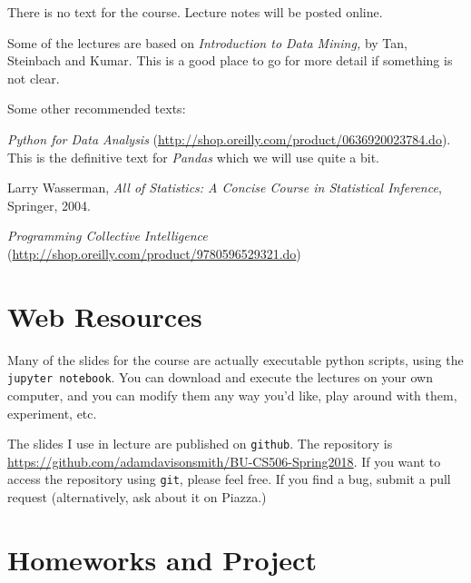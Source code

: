 \documentclass[11pt]{article}
\begin{document}
There is no text for the course.   Lecture notes will be posted online.

Some of the lectures are based on \emph{Introduction to Data Mining,} by
Tan, Steinbach and Kumar.  This is a good place to go for more detail if
something is not clear.

Some other recommended texts:
\begin{compactitem}
\item \emph{Python for Data Analysis}
  (\url{http://shop.oreilly.com/product/0636920023784.do}).  This is the
  definitive text for \emph{Pandas} which we will use quite a bit.

\item Larry Wasserman, \emph{All of Statistics: A Concise Course in Statistical
    Inference}, Springer,  2004. 

\item \emph{Programming Collective Intelligence}
  (\url{http://shop.oreilly.com/product/9780596529321.do})


\end{compactitem}

\section*{Web Resources} 

Many of the  slides for the course are actually executable python scripts, using the
\texttt{jupyter notebook}.   You can
download and execute the lectures on your own computer, and you can
modify them any way you'd like, play around with them, experiment, etc.

The slides I use in lecture are published on \texttt{github}.   The
repository is
\url{https://github.com/adamdavisonsmith/BU-CS506-Spring2018}.  If you want
to access the repository using \texttt{git}, please feel free.   If you
find a bug, submit a pull request (alternatively, ask
about it on Piazza.)
 
\section*{Homeworks and Project}
\end{document}
